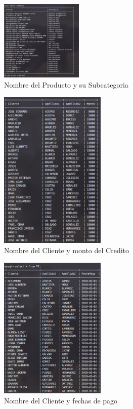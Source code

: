 \documentclass[12pt, fleqn]{article}                             %
\begin{document}
        \begin{figure}[ht!]
            \centering
            \includegraphics[width=0.35\textwidth]{BD5Reporte5}
            \caption{Nombre del Producto y su Subcategoria}
        \end{figure}

        \begin{figure}[ht!]
            \centering
            \includegraphics[width=0.45\textwidth]{BD5Reporte6}
            \caption{Nombre del Cliente y monto del Credito}
        \end{figure}

        \begin{figure}[ht!]
            \centering
            \includegraphics[width=0.45\textwidth]{BD5Reporte7}
            \caption{Nombre del Cliente y fechas de pago}
        \end{figure}
\end{document}
